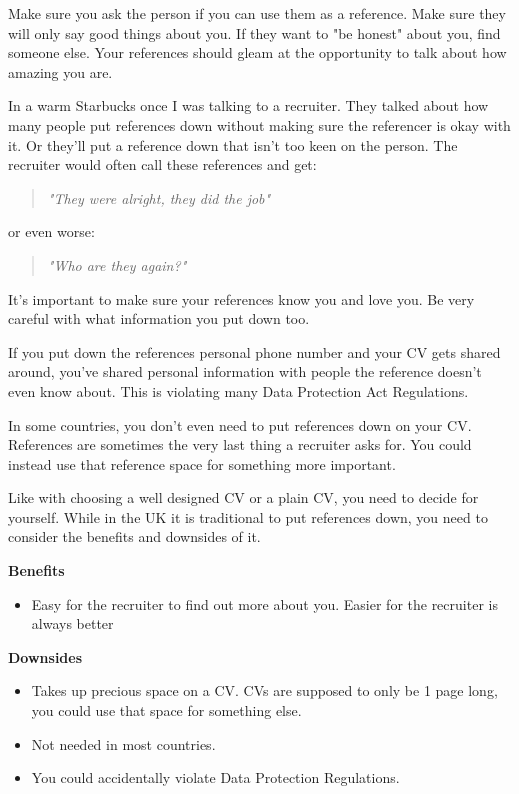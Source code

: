 \documentclass{article}
\begin{document}
Make sure you ask the person if you can use them as a reference. Make
sure they will only say good things about you. If they want to "be
honest" about you, find someone else. Your references should gleam at
the opportunity to talk about how amazing you are.

In a warm Starbucks once I was talking to a recruiter. They talked about
how many people put references down without making sure the referencer
is okay with it. Or they'll put a reference down that isn't too keen on
the person. The recruiter would often call these references and get:

\begin{quote}
\emph{"They were alright, they did the job"}
\end{quote}

or even worse:

\begin{quote}
\emph{"Who are they again?"}
\end{quote}

It's important to make sure your references know you and love you. Be
very careful with what information you put down too.

If you put down the references personal phone number and your CV gets
shared around, you've shared personal information with people the
reference doesn't even know about. This is violating many Data
Protection Act Regulations.

In some countries, you don't even need to put references down on your
CV. References are sometimes the very last thing a recruiter asks for.
You could instead use that reference space for something more important.

Like with choosing a well designed CV or a plain CV, you need to decide
for yourself. While in the UK it is traditional to put references down,
you need to consider the benefits and downsides of it.

\textbf{Benefits}

\begin{itemize}
\item
  Easy for the recruiter to find out more about you. Easier for the
  recruiter is always better
\end{itemize}

\textbf{Downsides}

\begin{itemize}
\item
  Takes up precious space on a CV. CVs are supposed to only be 1 page
  long, you could use that space for something else.
\item
  Not needed in most countries.
\item
  You could accidentally violate Data Protection Regulations.
\end{itemize}
\end{document}
